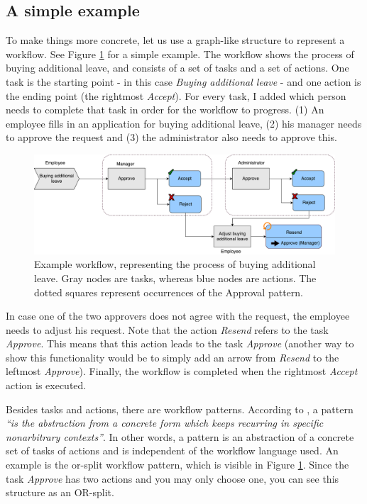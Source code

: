\documentclass[a4paper,11pt]{article}
\begin{document}
\subsection{A simple example}
To make things more concrete, let us use a graph-like structure to represent a workflow. See Figure \ref{figure:example_workflow} for a simple example. The workflow shows the process of buying additional leave, and consists of a set of tasks and a set of actions. One task is the starting point - in this case \textit{Buying additional leave} - and one action is the ending point (the rightmost \textit{Accept}). For every task, I added which person needs to complete that task in order for the workflow to progress. (1) An employee fills in an application for buying additional leave, (2) his manager needs to approve the request and (3) the administrator also needs to approve this. 

\begin{figure}[H]
\centering
\includegraphics[width=\linewidth]{Example_Workflow.pdf}
\caption{Example workflow, representing the process of buying additional leave. Gray nodes are tasks, whereas blue nodes are actions. The dotted squares represent occurrences of the Approval pattern.}
\label{figure:example_workflow}
\end{figure}

In case one of the two approvers does not agree with the request, the employee needs to adjust his request. Note that the action \textit{Resend} refers to the task \textit{Approve}. This means that this action leads to the task \textit{Approve} (another way to show this functionality would be to simply add an arrow from \textit{Resend} to the leftmost \textit{Approve}). Finally, the workflow is completed when the rightmost \textit{Accept} action is executed.

Besides tasks and actions, there are workflow patterns. According to \cite{Riehle1996}, a pattern \textit{“is the abstraction from a concrete form which keeps recurring in specific nonarbitrary contexts”}. In other words, a pattern is an abstraction of a concrete set of tasks of actions and is independent of the workflow language used. An example is the or-split workflow pattern, which is visible in Figure \ref{figure:example_workflow}. Since the task \textit{Approve} has two actions and you may only choose one, you can see this structure as an OR-split.
\end{document}
